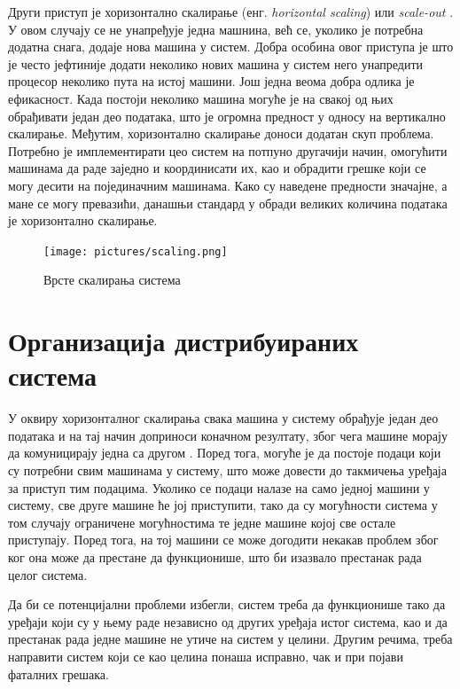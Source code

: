 \documentclass[12pt,oneside]{memoir}
\begin{document}
Други приступ је хоризонтално скалирање (енг. \textit{horizontal scaling}) или \textit{scale-out} \cite{hadoop_beginner}. У овом случају се не унапређује једна машнина, већ се, уколико је потребна додатна снага, додаје нова машина у систем. Добра особина овог приступа је што је често јефтиније додати неколико нових машина у систем него унапредити процесор неколико пута на истој машини. Још једна веома добра одлика је ефикасност. Када постоји неколико машина могуће је на свакој од њих обрађивати један део података, што је огромна предност у односу на вертикално скалирање. Међутим, хоризонтално скалирање доноси додатан скуп проблема. Потребно је имплементирати цео систем на потпуно другачији начин, омогућити машинама да раде заједно и координисати их, као и обрадити грешке који се могу десити на појединачним машинама. Како су наведене предности значајне, а мане се могу превазићи, данашњи стандард у обради великих количина података је хоризонтално скалирање.

\begin{figure}[!ht]
  \centering
  \texttt{[image: pictures/scaling.png]}
  \caption{Врсте скалирања система}
  \label{fig:skaliranje}
\end{figure}

\section{Организација дистрибуираних система}
\label{sec:scaling_osobine}

У оквиру хоризонталног скалирања свака машина у систему обрађује један део података и на тај начин доприноси коначном резултату, због чега машине морају да комуницирају једна са другом \cite{hadoop_beginner}. Поред тога, могуће је да постоје подаци који су потребни свим машинама у систему, што може довести до такмичења уређаја за приступ тим подацима. Уколико се подаци налазе на само једној машини у систему, све друге машине ће јој приступити, тако да су могућности система у том случају ограничене могућностима те једне машине којој све остале приступају. Поред тога, на тој машини се може догодити некакав проблем због ког она може да престане да функционише, што би изазвало престанак рада целог система.

Да би се потенцијални проблеми избегли, систем треба да функционише тако да уређаји који су у њему раде независно од других уређаја истог система, као и да престанак рада једне машине не утиче на систем у целини. Другим речима, треба направити систем који се као целина понаша исправно, чак и при појави фаталних грешака. 
\end{document}
